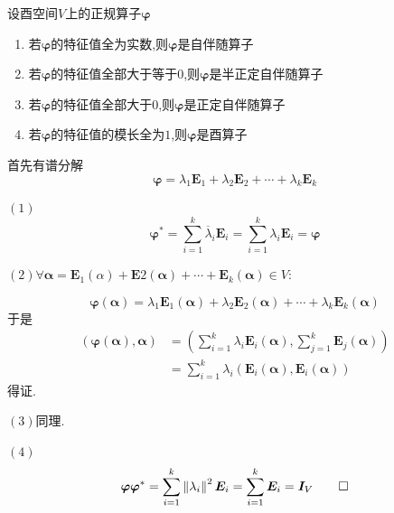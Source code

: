 \begin{formal}
    \begin{theorem}[利用特征值判定]\label{thm:利用特征值判定}
        设酉空间$V$上的正规算子$\bm{\varphi}$\begin{enumerate}[label={\textup{(\arabic*)}}]
            \item 若$\bm{\varphi}$的特征值全为实数,则$\bm{\varphi}$是自伴随算子
            \item 若$\bm{\varphi}$的特征值全部大于等于$0$,则$\bm{\varphi}$是半正定自伴随算子
            \item 若$\bm{\varphi}$的特征值全部大于$0$,则$\bm{\varphi}$是正定自伴随算子
            \item 若$\bm{\varphi}$的特征值的模长全为$1$,则$\bm{\varphi}$是酉算子
        \end{enumerate}
    \end{theorem}
    \begin{Proof}
        首先有谱分解\[
        \bm{\varphi}=\lambda_1\bm{E}_1+\lambda_2\bm{E}_2+\cdots+\lambda_k\bm{E}_k
        \]

        $(1)$\[
        \bm{\varphi}^*=\sum_{i=1}^{k}\overline{\lambda}_i\bm{E}_i=\sum_{i=1}^{k}\lambda_i\bm{E}_i=\bm{\varphi}
        \]

        $(2)\forall\bm{\alpha}=\bm{E}_1\left(\alpha\right)+\bm{E}2\left(\bm{\alpha}\right)+\cdots+\bm{E}_k\left(\bm{\alpha}\right)\in V:$

        \[
            \bm{\varphi}\left(\bm{\alpha}\right)=\lambda_1\bm{E}_1\left(\bm{\alpha}\right)+\lambda_2\bm{E}_2\left(\bm{\alpha}\right)+\cdots+\lambda_k\bm{E}_k\left(\bm{\alpha}\right)
        \]于是\begin{align*}
            \left(
                \bm{\varphi}\left(\bm{\alpha}\right),\bm{\alpha}
            \right)&=\left(
                \sum_{i=1}^{k}\lambda_i\bm{E}_i\left(\bm{\alpha}\right),\sum_{j=1}^{k}\bm{E}_j\left(\bm{\alpha}\right)
            \right)\\
            &=\sum_{i=1}^{k}\lambda_i\left(
                \bm{E}_i\left(\bm{\alpha}\right),\bm{E}_i\left(\bm{\alpha}\right)
            \right)
        \end{align*}得证.

        $(3)$同理.

        $(4)$\[
        \bm{\varphi\varphi}^* =\sum_{i=1}^{k}\left\lVert\lambda_i\right\rVert^2\bm{E}_i=\sum_{i=1}^{k}\bm{E}_i=\bm{I}_V\qedhere
        \]
    \end{Proof}
\end{formal}

